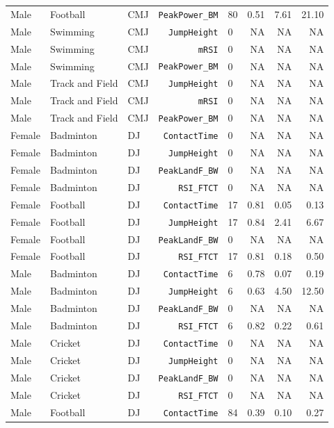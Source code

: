 {\begin{longtable}{lllrlrrr}
Male & Football & CMJ & \texttt{PeakPower\_BM} & 80 & 0.51 & 7.61 & 21.10 \\
Male & Swimming & CMJ & \texttt{JumpHeight} & 0 & NA & NA & NA \\
Male & Swimming & CMJ & \texttt{mRSI} & 0 & NA & NA & NA \\
Male & Swimming & CMJ & \texttt{PeakPower\_BM} & 0 & NA & NA & NA \\
Male & Track and Field & CMJ & \texttt{JumpHeight} & 0 & NA & NA & NA \\
Male & Track and Field & CMJ & \texttt{mRSI} & 0 & NA & NA & NA \\
Male & Track and Field & CMJ & \texttt{PeakPower\_BM} & 0 & NA & NA & NA \\
\addlinespace[1pt]
Female & Badminton & DJ & \texttt{ContactTime} & 0 & NA & NA & NA \\
Female & Badminton & DJ & \texttt{JumpHeight} & 0 & NA & NA & NA \\
Female & Badminton & DJ & \texttt{PeakLandF\_BW} & 0 & NA & NA & NA \\
Female & Badminton & DJ & \texttt{RSI\_FTCT} & 0 & NA & NA & NA \\
Female & Football & DJ & \texttt{ContactTime} & 17 & 0.81 & 0.05 & 0.13 \\
Female & Football & DJ & \texttt{JumpHeight} & 17 & 0.84 & 2.41 & 6.67 \\
Female & Football & DJ & \texttt{PeakLandF\_BW} & 0 & NA & NA & NA \\
Female & Football & DJ & \texttt{RSI\_FTCT} & 17 & 0.81 & 0.18 & 0.50 \\
Male & Badminton & DJ & \texttt{ContactTime} & 6 & 0.78 & 0.07 & 0.19 \\
Male & Badminton & DJ & \texttt{JumpHeight} & 6 & 0.63 & 4.50 & 12.50 \\
Male & Badminton & DJ & \texttt{PeakLandF\_BW} & 0 & NA & NA & NA \\
Male & Badminton & DJ & \texttt{RSI\_FTCT} & 6 & 0.82 & 0.22 & 0.61 \\
Male & Cricket & DJ & \texttt{ContactTime} & 0 & NA & NA & NA \\
Male & Cricket & DJ & \texttt{JumpHeight} & 0 & NA & NA & NA \\
Male & Cricket & DJ & \texttt{PeakLandF\_BW} & 0 & NA & NA & NA \\
Male & Cricket & DJ & \texttt{RSI\_FTCT} & 0 & NA & NA & NA \\
Male & Football & DJ & \texttt{ContactTime} & 84 & 0.39 & 0.10 & 0.27 \\

\end{longtable}}
